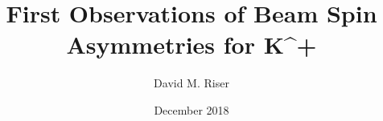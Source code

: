 \title{First Observations of Beam Spin Asymmetries for K^+}
\author{David M. Riser}
\date{December 2018}

